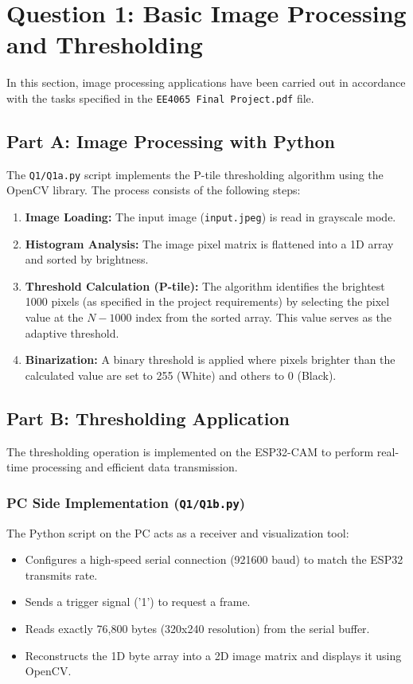 \section{Question 1: Basic Image Processing and Thresholding}

In this section, image processing applications have been carried out in accordance with the tasks specified in the \texttt{EE4065 Final Project.pdf} file.

\subsection{Part A: Image Processing with Python}
The \texttt{Q1/Q1a.py} script implements the P-tile thresholding algorithm using the OpenCV library. The process consists of the following steps:
\begin{enumerate}
    \item \textbf{Image Loading:} The input image (\texttt{input.jpeg}) is read in grayscale mode.
    \item \textbf{Histogram Analysis:} The image pixel matrix is flattened into a 1D array and sorted by brightness.
    \item \textbf{Threshold Calculation (P-tile):} The algorithm identifies the brightest 1000 pixels (as specified in the project requirements) by selecting the pixel value at the $N-1000$ index from the sorted array. This value serves as the adaptive threshold.
    \item \textbf{Binarization:} A binary threshold is applied where pixels brighter than the calculated value are set to 255 (White) and others to 0 (Black).
\end{enumerate}

\subsection{Part B: Thresholding Application}
The thresholding operation is implemented on the ESP32-CAM to perform real-time processing and efficient data transmission.

\subsubsection{PC Side Implementation (\texttt{Q1/Q1b.py})}
The Python script on the PC acts as a receiver and visualization tool:
\begin{itemize}
    \item Configures a high-speed serial connection (921600 baud) to match the ESP32 transmits rate.
    \item Sends a trigger signal ('1') to request a frame.
    \item Reads exactly 76,800 bytes (320x240 resolution) from the serial buffer.
    \item Reconstructs the 1D byte array into a 2D image matrix and displays it using OpenCV.
\end{itemize}

